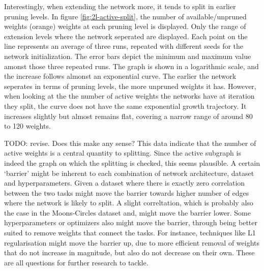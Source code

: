 Interestingly, when extending the network more, it tends to split in earlier pruning levels.
In figure \ref{fig:2l-active-split}, the number of available/unpruned weights (orange) weights at each pruning level is displayed.
Only the range of extension levels where the network seperated are displayed.
Each point on the line represents an average of three runs, repeated with different seeds for the network initialization.
The error bars depict the minimum and maximum value amonst those three repeated runs.
The graph is shown in a logarithmic scale, and the increase follows almonst an exponential curve.
The earlier the network seperates in terms of pruning levels, the more unpruned weights it has.
However, when looking at the the number of active weights the networks have at iteration they split, the curve does not have the same exponential growth trajectory.
It increases slightly but almost remains flat, covering a narrow range of around 80 to 120 weights.

TODO: revise. Does this make any sense?
This data indicate that the number of active weights is a central quantity to splitting.
Since the active subgraph is indeed the graph on which the splitting is checked, this seems plausible.
A certain `barrier' might be inherent to each combination of network architecture, dataset and hyperparameters.
Given a dataset where there is exactly zero correlation between the two tasks might move the barrier towards higher number of edges where the network is likely to split.
A slight correltation, which is probably also the case in the Moons-Circles dataset and, might move the barrier lower.
Some hyperparameters or optimizers also might move the barrier, through being better suited to remove weights that connect the tasks.
For instance, techniques like L1 regularisation might move the barrier up, due to more efficient removal of weights that do not increase in magnitude, but also do not decrease on their own.
These are all questions for further research to tackle.
 
